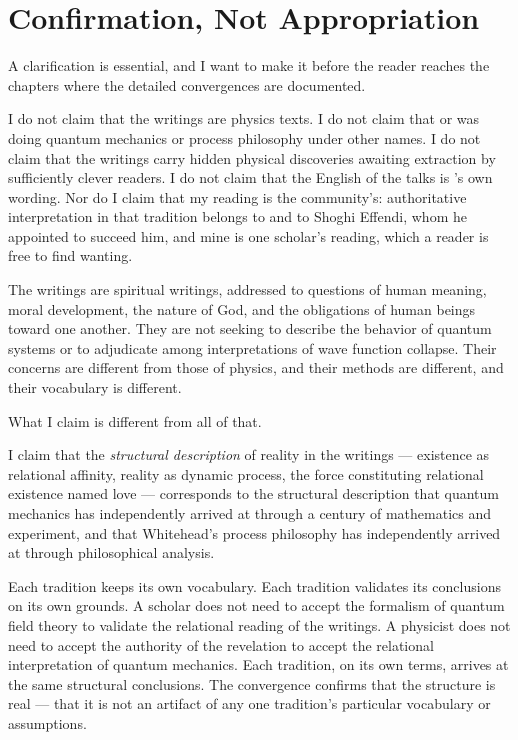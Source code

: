 \section{Confirmation, Not Appropriation}
\label{sec:ch3-confirmation}

A clarification is essential, and I want to make it before the reader
reaches the chapters where the detailed convergences are documented.

I do not claim that the \bahai writings are physics texts.
I do not claim that \Bahaullah or \AbdulBaha was doing quantum mechanics
or process philosophy under other names.
I do not claim that the writings carry hidden physical discoveries awaiting
extraction by sufficiently clever readers.
I do not claim that the English of the talks is \AbdulBaha's own wording.
Nor do I claim that my reading is the \bahai community's: authoritative
interpretation in that tradition belongs to \AbdulBaha and to Shoghi Effendi,
whom he appointed to succeed him, and mine is one scholar's reading, which a
\bahai reader is free to find wanting.

The \bahai writings are spiritual writings, addressed to questions of human
meaning, moral development, the nature of God, and the obligations of
human beings toward one another.
They are not seeking to describe the behavior of quantum systems or to
adjudicate among interpretations of wave function collapse.
Their concerns are different from those of physics, and their methods
are different, and their vocabulary is different.

What I claim is different from all of that.

I claim that the \emph{structural description} of reality in the \bahai writings
--- existence as relational affinity, reality as dynamic process, the force
constituting relational existence named love --- corresponds to the structural
description that quantum mechanics has independently arrived at through
a century of mathematics and experiment, and that Whitehead's process
philosophy has independently arrived at through philosophical analysis.

Each tradition keeps its own vocabulary.
Each tradition validates its conclusions on its own grounds.
A \bahai scholar does not need to accept the formalism of quantum field
theory to validate the relational reading of the writings.
A physicist does not need to accept the authority of the \bahai revelation
to accept the relational interpretation of quantum mechanics.
Each tradition, on its own terms, arrives at the same structural conclusions.
The convergence confirms that the structure is real --- that it is not an
artifact of any one tradition's particular vocabulary or assumptions.

